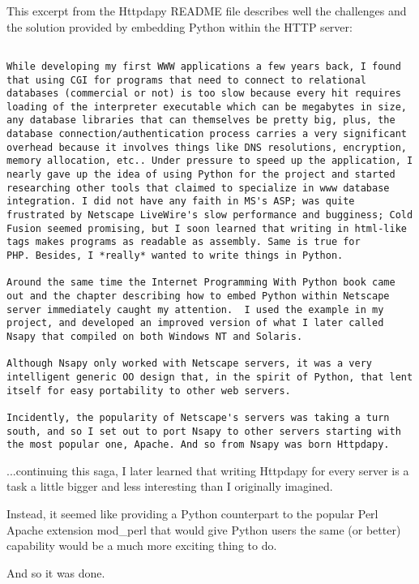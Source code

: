 This excerpt from the Httpdapy README file describes well the
challenges and the solution provided by embedding Python within the
HTTP server:

\begin{verbatim}

While developing my first WWW applications a few years back, I found
that using CGI for programs that need to connect to relational
databases (commercial or not) is too slow because every hit requires
loading of the interpreter executable which can be megabytes in size,
any database libraries that can themselves be pretty big, plus, the
database connection/authentication process carries a very significant
overhead because it involves things like DNS resolutions, encryption,
memory allocation, etc.. Under pressure to speed up the application, I
nearly gave up the idea of using Python for the project and started
researching other tools that claimed to specialize in www database
integration. I did not have any faith in MS's ASP; was quite
frustrated by Netscape LiveWire's slow performance and bugginess; Cold
Fusion seemed promising, but I soon learned that writing in html-like
tags makes programs as readable as assembly. Same is true for
PHP. Besides, I *really* wanted to write things in Python.

Around the same time the Internet Programming With Python book came
out and the chapter describing how to embed Python within Netscape
server immediately caught my attention.  I used the example in my
project, and developed an improved version of what I later called
Nsapy that compiled on both Windows NT and Solaris.

Although Nsapy only worked with Netscape servers, it was a very
intelligent generic OO design that, in the spirit of Python, that lent
itself for easy portability to other web servers.

Incidently, the popularity of Netscape's servers was taking a turn
south, and so I set out to port Nsapy to other servers starting with
the most popular one, Apache. And so from Nsapy was born Httpdapy.

\end{verbatim}

...continuing this saga, I later learned that writing Httpdapy for
every server is a task a little bigger and less interesting than I
originally imagined.

Instead, it seemed like providing a Python counterpart to the popular
Perl Apache extension mod_perl that would give Python users the same
(or better) capability would be a much more exciting thing to do.

And so it was done. 

